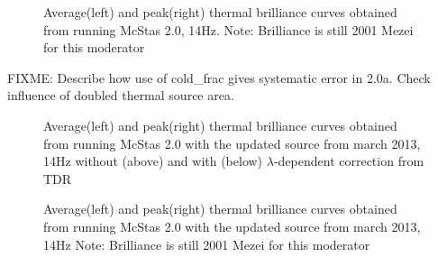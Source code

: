 \documentclass{elsarticle}
\begin{document}
\begin{figure}[h!]
\begin{minipage}{\linewidth}
\centering
{}
\caption{Average(left) and peak(right) thermal brilliance curves
  obtained from running McStas 2.0, 14Hz. Note: Brilliance is still
  2001 Mezei for this moderator }
\label{fig:2.0_thermal}
\end{minipage}\hfill
\end{figure}

FIXME: Describe how use of cold\_frac gives systematic error in
2.0a. Check influence of doubled thermal source area.
\begin{figure}[h!]
\begin{minipage}{\linewidth}
\centering
{}
\caption{Average(left) and peak(right) thermal brilliance curves
  obtained from running McStas 2.0 with the updated source from march 2013, 14Hz without (above) and with (below)
  $\lambda$-dependent correction from TDR }
\label{fig:2.0_cold}
\end{minipage}\hfill
\end{figure}


\begin{figure}[h!]
\begin{minipage}{\linewidth}
\centering
{}
\caption{Average(left) and peak(right) thermal brilliance curves
  obtained from running McStas 2.0 with the updated source from march 2013, 14Hz Note: Brilliance is still
  2001 Mezei for this moderator  }
\label{fig:2.0_thermal}
\end{minipage}\hfill
\end{figure}








\end{document}
